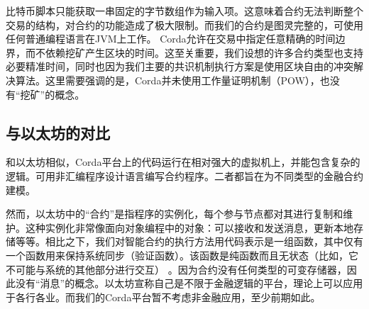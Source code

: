 \documentclass[UTF8]{ctexart}
\begin{document}
比特币脚本只能获取一串固定的字节数组作为输入项。这意味着合约无法判断整个交易的结构，对合约的功能造成了极大限制。而我们的合约是图灵完整的，可使用任何普通编程语言在JVM上工作。	
Corda允许在交易中指定任意精确的时间边界，而不依赖挖矿产生区块的时间。这至关重要，我们设想的许多合约类型也支持必要精准时间，同时也因为我们主要的共识机制执行方案是使用区块自由的冲突解决算法。这里需要强调的是，Corda并未使用工作量证明机制（POW），也没有“挖矿”的概念。

\subsection{与以太坊的对比}
和以太坊相似，Corda平台上的代码运行在相对强大的虚拟机上，并能包含复杂的逻辑。可用非汇编程序设计语言编写合约程序。二者都旨在为不同类型的金融合约建模。

然而，以太坊中的“合约”是指程序的实例化，每个参与节点都对其进行复制和维护。这种实例化非常像面向对象编程中的对象：可以接收和发送消息，更新本地存储等等。相比之下，我们对智能合约的执行方法用代码表示是一组函数，其中仅有一个函数用来保持系统同步（验证函数）。该函数是纯函数而且无状态（比如，它不可能与系统的其他部分进行交互）	。因为合约没有任何类型的可变存储器，因此没有“消息”的概念。以太坊宣称自己是不限于金融逻辑的平台，理论上可以应用于各行各业。而我们的Corda平台暂不考虑非金融应用，至少前期如此。



\end{document}
